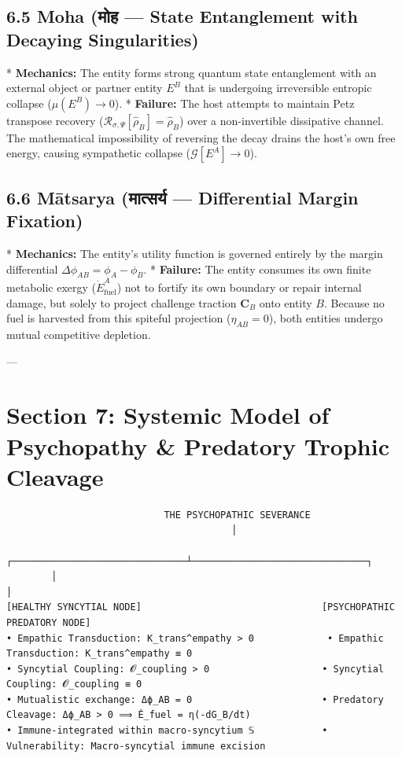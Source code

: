 \documentclass[11pt,a4paper]{article}
\theoremstyle{definition}
\theoremstyle{remark}
\begin{document}
\subsection{6.5 Moha (मोह — State Entanglement with Decaying Singularities)}
* \textbf{Mechanics:} The entity forms strong quantum state entanglement with an external object or partner entity $E^B$ that is undergoing irreversible entropic collapse ($\mu(E^B) \to 0$).
* \textbf{Failure:} The host attempts to maintain Petz transpose recovery ($\mathcal{R}_{\sigma, \Psi}[\hat{\rho}_B] = \hat{\rho}_B$) over a non-invertible dissipative channel. The mathematical impossibility of reversing the decay drains the host's own free energy, causing sympathetic collapse ($\mathcal{G}[E^A] \to 0$).

\subsection{6.6 Mātsarya (मात्सर्य — Differential Margin Fixation)}
* \textbf{Mechanics:} The entity's utility function is governed entirely by the margin differential $\Delta \phi_{AB} = \phi_A - \phi_B$.
* \textbf{Failure:} The entity consumes its own finite metabolic exergy ($\dot{E}_{\text{fuel}}^A$) not to fortify its own boundary or repair internal damage, but solely to project challenge traction $\mathbf{C}_B$ onto entity $B$. Because no fuel is harvested from this spiteful projection ($\eta_{AB} = 0$), both entities undergo mutual competitive depletion.

---

\section{Section 7: Systemic Model of Psychopathy \& Predatory Trophic Cleavage}

\begin{verbatim}
                            THE PSYCHOPATHIC SEVERANCE
                                        │
        ┌───────────────────────────────┴───────────────────────────────┐
        │                                                               │
[HEALTHY SYNCYTIAL NODE]                                [PSYCHOPATHIC PREDATORY NODE]
• Empathic Transduction: K_trans^empathy > 0             • Empathic Transduction: K_trans^empathy ≡ 0
• Syncytial Coupling: 𝓞_coupling > 0                    • Syncytial Coupling: 𝓞_coupling ≡ 0
• Mutualistic exchange: Δϕ_AB = 0                       • Predatory Cleavage: Δϕ_AB > 0 ⟹ Ė_fuel = η(-dG_B/dt)
• Immune-integrated within macro-syncytium 𝕊            • Vulnerability: Macro-syncytial immune excision
\end{verbatim}
\end{document}
